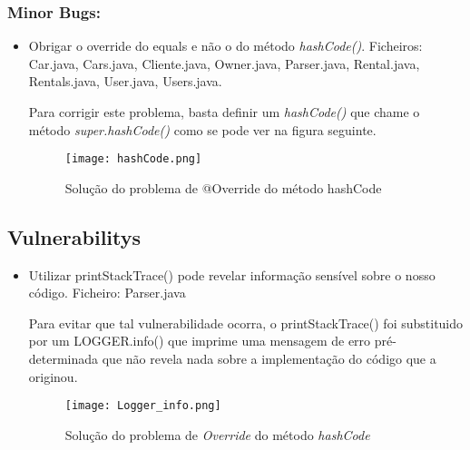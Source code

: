 \subsubsection{Minor Bugs:}
\begin{itemize}
\item Obrigar o override do equals e não o do método \textit{hashCode()}.\newline
 Ficheiros: Car.java, Cars.java, Cliente.java, Owner.java, Parser.java, Rental.java, Rentals.java, User.java, Users.java.\newline


\par Para corrigir este problema, basta definir um \textit{hashCode()} que chame o método \textit{super.hashCode()} como se pode ver na figura seguinte.

\begin{figure}[H]

  \centering

  \texttt{[image: hashCode.png]}

  \caption {Solução do problema de @Override do método hashCode}

  \label {fig08}

\end{figure}

\end{itemize}


\subsection{Vulnerabilitys}
\begin{itemize}
\item Utilizar printStackTrace() pode revelar informação sensível sobre o nosso código.\newline
 Ficheiro: Parser.java\newline

 \par Para evitar que tal vulnerabilidade ocorra, o printStackTrace() foi substituido por um LOGGER.info() que imprime uma mensagem de erro pré-determinada que não revela nada sobre a implementação do código que a originou.
 \begin{figure}[H]

  \centering

  \texttt{[image: Logger\_info.png]}

  \caption {Solução do problema de \textit{Override} do método \textit{hashCode}}

  \label {fig09}

\end{figure}

\end{itemize}

